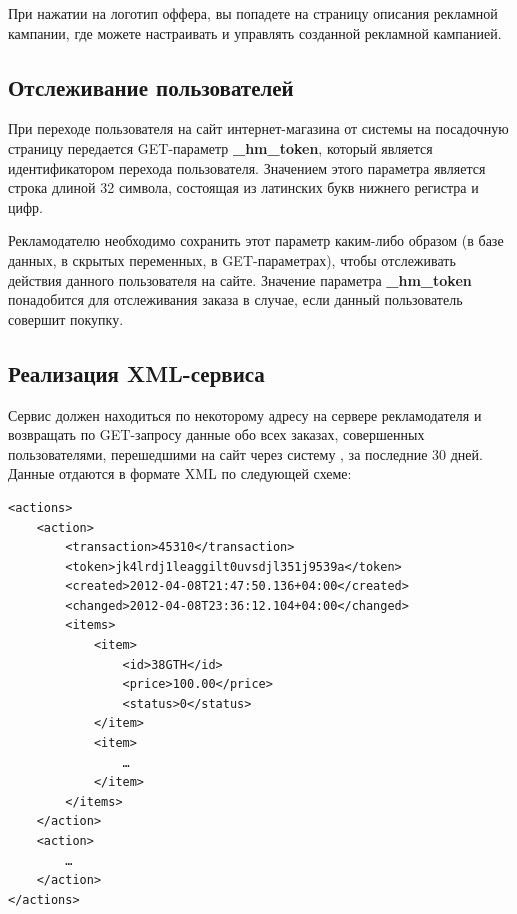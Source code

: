 \documentclass[a4paper,12pt]{article}
\begin{document}
При нажатии на логотип оффера, вы попадете на страницу описания рекламной кампании, где можете настраивать и управлять созданной рекламной кампанией.

\subsection{Отслеживание пользователей}

При переходе пользователя на сайт интернет-магазина от системы \heymoose{} на посадочную страницу передается GET-параметр \textbf{\_hm\_token}, который является идентификатором перехода пользователя. Значением этого параметра является строка длиной 32 символа, состоящая из латинских букв нижнего регистра и цифр.

Рекламодателю необходимо сохранить этот параметр каким-либо образом (в базе данных, в скрытых переменных, в GET-параметрах), чтобы отслеживать действия данного пользователя на сайте. Значение параметра \textbf{\_hm\_token} понадобится для отслеживания заказа в случае, если данный пользователь совершит покупку.

\subsection{Реализация XML-сервиса}

\begin{samepage}

Сервис должен находиться по некоторому адресу на сервере рекламодателя и возвращать по GET-запросу данные обо всех заказах, совершенных пользователями, перешедшими на сайт через систему \heymoose{}, за последние 30 дней. Данные отдаются в формате XML по следующей схеме:

\begin{footnotesize}
\begin{verbatim}
<actions>
    <action>
        <transaction>45310</transaction>
        <token>jk4lrdj1leaggilt0uvsdjl351j9539a</token>
        <created>2012-04-08T21:47:50.136+04:00</created>
        <changed>2012-04-08T23:36:12.104+04:00</changed>
        <items>
            <item>
                <id>38GTH</id>
                <price>100.00</price>
                <status>0</status>
            </item>
            <item>
                …
            </item>
        </items>
    </action>
    <action>
        …
    </action>
</actions>
\end{verbatim}
\end{footnotesize}

\end{samepage}
\end{document}

